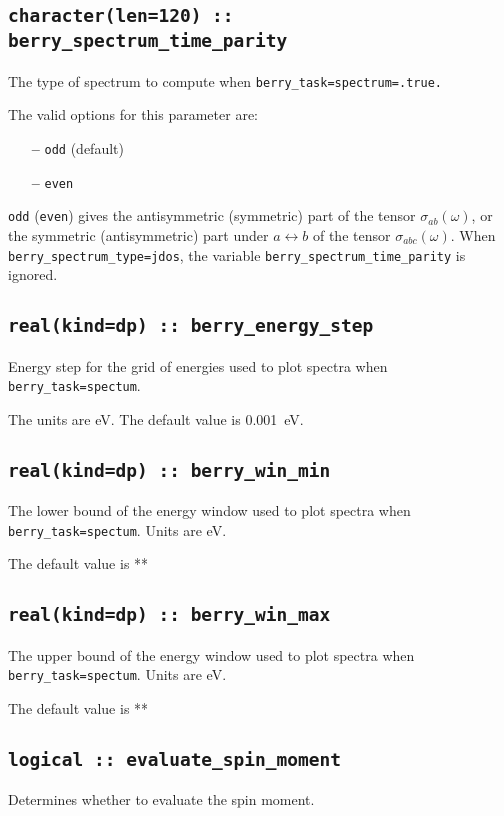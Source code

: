 \subsection[berry\_spectrum\_time\_parity]{\tt character(len=120) ::  berry\_spectrum\_time\_parity}
The type of spectrum to compute when {\tt berry\_task=spectrum=.true.} 

The valid options for this parameter are:
\begin{itemize}
\item[{\bf --}]  \verb#odd# (default) 
\item[{\bf --}]  \verb#even#  
\end{itemize}

\verb#odd# (\verb#even#) gives the antisymmetric (symmetric) part of
the tensor $\sigma_{ab}(\omega)$, or the symmetric (antisymmetric)
part under $a\leftrightarrow b$ of the tensor $\sigma_{abc}(\omega)$.
When \texttt{berry\_spectrum\_type=jdos}, the variable
\texttt{berry\_spectrum\_time\_parity} is ignored.

\subsection[berry\_energy\_step]{\tt real(kind=dp) :: berry\_energy\_step}
Energy step for the grid of energies used to plot spectra when {\tt berry\_task=spectum}.

The units are eV.
The default value is 0.001~eV.

\subsection[berry\_win\_min]{\tt real(kind=dp) :: berry\_win\_min}
The lower bound of the energy window  used to plot spectra when {\tt berry\_task=spectum}.
Units are eV.

The default value is **

\subsection[berry\_win\_max]{\tt real(kind=dp) :: berry\_win\_max}
The upper bound of the energy window used to plot spectra when {\tt berry\_task=spectum}.
Units are eV.

The default value is **


\subsection[evaluate\_spin\_moment]{\tt logical :: evaluate\_spin\_moment}
Determines whether to evaluate the spin moment.

